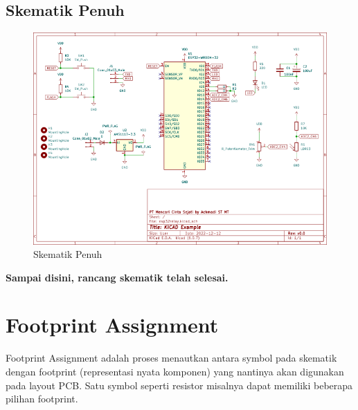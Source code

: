 \documentclass[12pt]{book}
\begin{document}
	\newpage
	\section{Skematik Penuh}

	\begin{figure}[!ht]
		\centering
		\includegraphics[width=\textwidth]{images/sch/esp32relay}
		\caption{Skematik Penuh}
	\end{figure}

	\begin{center}
		\textbf{Sampai disini, rancang skematik telah selesai.}
	\end{center}


	\newpage
	\chapter{Footprint Assignment}

	Footprint Assignment adalah proses menautkan antara symbol pada skematik dengan footprint (representasi nyata komponen)
	yang nantinya akan digunakan pada layout PCB.
	Satu symbol seperti resistor misalnya dapat memiliki beberapa pilihan footprint.
\end{document}
